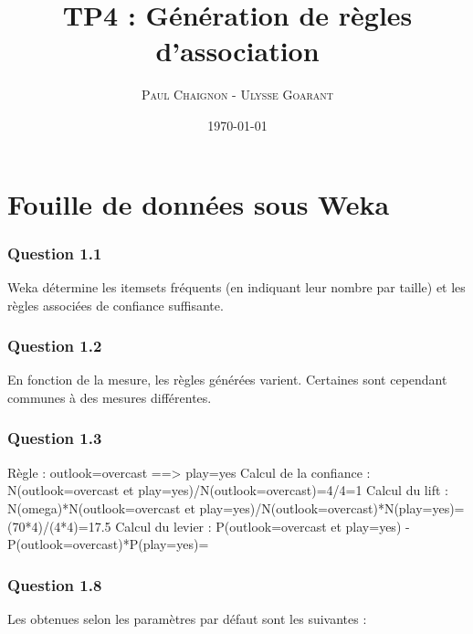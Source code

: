 \documentclass[a4paper,12pt]{article}
\title{TP4 : Génération de règles d'association}
\author{\textsc{Paul Chaignon} - \textsc{Ulysse Goarant}}
\date{\today}
\begin{document}
\maketitle

\section{Fouille de données sous Weka}


\subsubsection*{Question 1.1}
Weka détermine les itemsets fréquents (en indiquant leur nombre par taille) et les règles associées de confiance suffisante.

\subsubsection*{Question 1.2}
En fonction de la mesure, les règles générées varient. Certaines sont cependant communes à des mesures différentes.

\subsubsection*{Question 1.3}
Règle : outlook=overcast ==> play=yes
Calcul de la confiance : N(outlook=overcast et play=yes)/N(outlook=overcast)=4/4=1
Calcul du lift : N(omega)*N(outlook=overcast et play=yes)/N(outlook=overcast)*N(play=yes)=(70*4)/(4*4)=17.5
Calcul du levier : P(outlook=overcast et play=yes) - P(outlook=overcast)*P(play=yes)=

\subsubsection*{Question 1.8}
Les obtenues selon les paramètres par défaut sont les suivantes :
\end{document}
